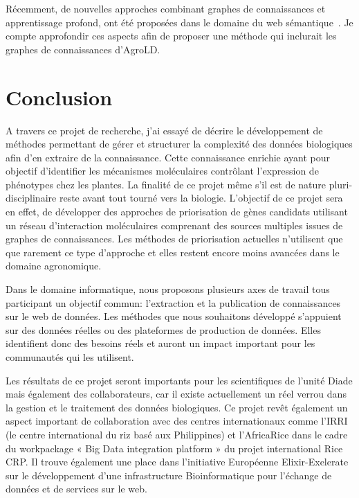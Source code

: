 
Récemment, de nouvelles approches combinant graphes de connaissances et apprentissage profond, ont été proposées dans le domaine du web sémantique~\cite{rdf2vec2016,cochez2017,vec2sparql2018,nikolov2018combining}. Je compte approfondir ces aspects afin de proposer une méthode qui inclurait les graphes de connaissances d'AgroLD.

\section{Conclusion}
A travers ce projet de recherche, j'ai essayé de décrire le développement de méthodes permettant de gérer et structurer la complexité des données biologiques afin d'en extraire de la connaissance. Cette connaissance enrichie ayant pour objectif d’identifier les mécanismes moléculaires contrôlant l’expression de phénotypes chez les plantes. La finalité de ce projet même s'il est de nature pluri-disciplinaire reste avant tout tourné vers la biologie. L’objectif de ce projet sera en effet, de développer des approches de priorisation de gènes candidats utilisant un réseau d’interaction moléculaires comprenant des sources multiples issues de graphes de connaissances. Les méthodes de priorisation actuelles n'utilisent que que rarement ce type d'approche et elles restent encore moins avancées dans le domaine agronomique. 

Dans le domaine informatique, nous proposons plusieurs axes de travail tous participant un objectif commun: l'extraction et la publication de connaissances sur le web de données. Les méthodes que nous souhaitons développé s'appuient sur des données réelles ou des plateformes de production de données. Elles identifient donc des besoins réels et auront un impact important pour les communautés qui les utilisent.

Les résultats de ce projet seront importants pour les scientifiques de l’unité Diade mais également des collaborateurs, car il existe actuellement un réel verrou dans la gestion et le traitement des données biologiques. Ce projet revêt également un aspect important de collaboration avec des centres internationaux comme l’IRRI (le centre international du riz basé aux Philippines) et l'AfricaRice dans le cadre du workpackage « Big Data integration platform » du projet international Rice CRP. Il trouve également une place dans l'initiative Européenne Elixir-Exelerate sur le développement d'une infrastructure Bioinformatique pour l'échange de données et de services sur le web.  



